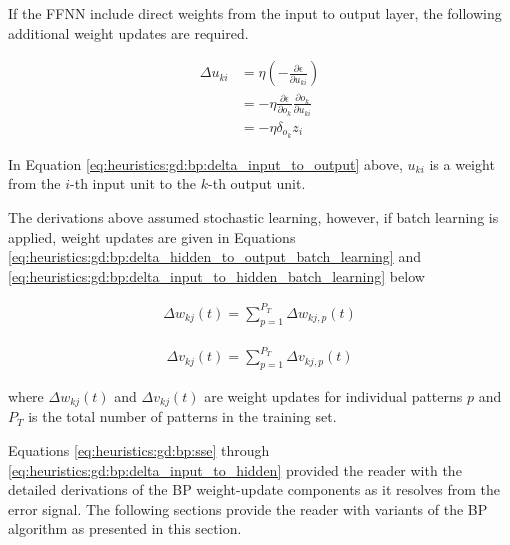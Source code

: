 If the \ac{FFNN} include direct weights from the input to output layer, the following additional weight updates are required.

\begin{equation}
      \label{eq:heuristics:gd:bp:delta_input_to_output}
      \begin{split}
            \Delta u_{ki}
            &= \eta \left( - \frac{\partial \epsilon}{\partial u_{ki}} \right)\\
            &= -\eta \frac{\partial \epsilon}{\partial o_{k}} \frac{\partial o_{k}}{\partial u_{ki}}\\
            &= -\eta \delta_{o_{k}}z_{i}
      \end{split}
\end{equation}

In Equation \ref{eq:heuristics:gd:bp:delta_input_to_output} above, $u_{ki}$ is a weight from the $i$-th input unit to the $k$-th output unit.

The derivations above assumed stochastic learning, however, if batch learning is applied, weight updates are given in Equations \ref{eq:heuristics:gd:bp:delta_hidden_to_output_batch_learning} and \ref{eq:heuristics:gd:bp:delta_input_to_hidden_batch_learning} below

\begin{equation}
      \label{eq:heuristics:gd:bp:delta_hidden_to_output_batch_learning}
      \begin{split}
            \Delta w_{kj}(t) = \sum^{P_{T}}_{p=1} \Delta w_{kj,p}(t)
      \end{split}
\end{equation}

\begin{equation}
      \label{eq:heuristics:gd:bp:delta_input_to_hidden_batch_learning}
      \begin{split}
            \Delta v_{kj}(t) = \sum^{P_{T}}_{p=1} \Delta v_{kj,p}(t)
      \end{split}
\end{equation}

where $\Delta w_{kj}(t)$ and $\Delta v_{kj}(t)$ are weight updates for individual patterns $p$ and $P_{T}$ is the total number of patterns in the training set.

Equations \ref{eq:heuristics:gd:bp:sse} through \ref{eq:heuristics:gd:bp:delta_input_to_hidden} provided the reader with the detailed derivations of the \ac{BP} weight-update components as it resolves from the error signal. The following sections provide the reader with variants of the \ac{BP} algorithm as presented in this section.



